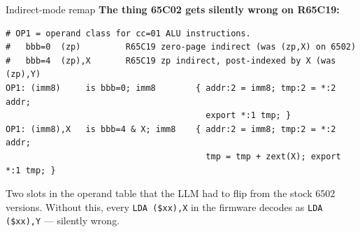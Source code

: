\documentclass[aspectratio=169,11pt]{beamer}
\begin{document}
\begin{frame}[fragile]{Indirect-mode remap}
\textbf{The thing 65C02 gets silently wrong on R65C19:}
\begin{lstlisting}[language=sleigh]
# OP1 = operand class for cc=01 ALU instructions.
#   bbb=0  (zp)         R65C19 zero-page indirect (was (zp,X) on 6502)
#   bbb=4  (zp),X       R65C19 zp indirect, post-indexed by X (was (zp),Y)
OP1: (imm8)     is bbb=0; imm8        { addr:2 = imm8; tmp:2 = *:2 addr;
                                        export *:1 tmp; }
OP1: (imm8),X   is bbb=4 & X; imm8    { addr:2 = imm8; tmp:2 = *:2 addr;
                                        tmp = tmp + zext(X); export *:1 tmp; }
\end{lstlisting}
\vspace{0.3em}

Two slots in the operand table that the LLM had to flip from the
stock 6502 versions. Without this, every \texttt{LDA (\$xx),X} in the
firmware decodes as \texttt{LDA (\$xx),Y} --- silently wrong.
\end{frame}
\end{document}
